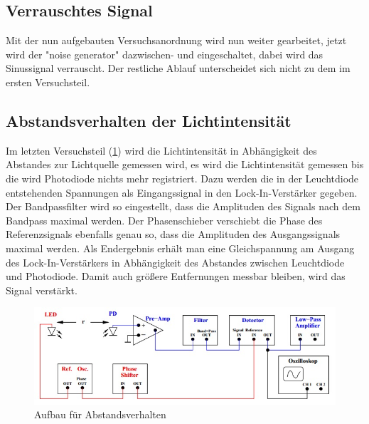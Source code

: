 \subsection{Verrauschtes Signal}

Mit der nun aufgebauten Versuchsanordnung wird nun weiter gearbeitet,
jetzt wird der "noise generator"  dazwischen- und eingeschaltet, dabei wird das Sinussignal verrauscht. Der restliche Ablauf unterscheidet sich nicht zu dem im ersten Versuchsteil.

\subsection{Abstandsverhalten der Lichtintensität}

Im letzten Versuchsteil (\cref{fig:Aufbau2}) wird die Lichtintensität in Abhängigkeit des Abstandes zur Lichtquelle
gemessen wird, es wird die Lichtintensität gemessen bis die wird Photodiode nichts mehr registriert. Dazu werden die in der Leuchtdiode entstehenden Spannungen als Eingangssignal in den Lock-In-Verstärker gegeben. Der Bandpassfilter wird so eingestellt, dass die Amplituden des Signals nach dem Bandpass maximal werden. Der Phasenschieber verschiebt die Phase des Referenzsignals ebenfalls genau so, dass die Amplituden des Ausgangssignals maximal werden. Als Endergebnis erhält man eine Gleichspannung am Ausgang des Lock-In-Verstärkers in Abhängigkeit des Abstandes zwischen Leuchtdiode und Photodiode. 
Damit auch größere Entfernungen messbar bleiben, wird das Signal verstärkt.


\begin{figure}[h]
	\centering
	\includegraphics[scale=0.8]{Grafiken/V303Aufbau2.jpg}
	\caption{Aufbau für Abstandsverhalten}
	\label{fig:Aufbau2}
\end{figure}
